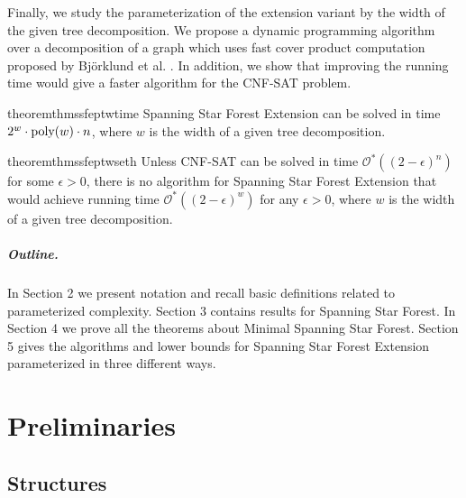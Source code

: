 \documentclass[en]{pracamgr}
\theoremstyle{definition}
\newcommand{\ssfp}{{\sc Spanning Star Forest}}
\newcommand{\mssfp}{{\sc Minimal Spanning Star Forest}}
\newcommand{\ssfep}{{\sc Spanning Star Forest Extension}}
\newcommand{\cnfsat}{{\sc CNF-SAT}}
\begin{document}
Finally, we study the parameterization of the extension variant by the width of the given tree decomposition. We propose a dynamic programming algorithm over a decomposition of a graph which uses fast cover product computation proposed by Björklund et al. \cite{CoverProduct}. In addition, we show that improving the running time would give a faster algorithm for the \cnfsat{} problem.

\begin{restatable}{theorem}{thmssfeptwtime}\label{thm-ssfep-tw-time}
	\ssfep{} can be solved in time $2^w\cdot \textup{poly}(w)\cdot n$, where $w$ is the width of a given tree decomposition.
\end{restatable}

\begin{restatable}{theorem}{thmssfeptwseth}\label{thm-ssfep-tw-seth}
	Unless \cnfsat{} can be solved in time $\mathcal{O}^*((2-\epsilon)^n)$ for some $\epsilon > 0$, there is no algorithm for \ssfep{} that would achieve running time $\mathcal{O}^*((2-\epsilon)^{w})$ for any $\epsilon > 0$, where $w$ is the width of a given tree decomposition.
\end{restatable}

\paragraph{Outline.} In Section 2 we present notation and recall basic definitions related to parameterized complexity. Section 3 contains results for \ssfp{}. In Section 4 we prove all the theorems about \mssfp{}. Section 5 gives the algorithms and lower bounds for \ssfep{} parameterized in three different ways.

\chapter{Preliminaries}\label{sec2}

\section{Structures}
\end{document}
